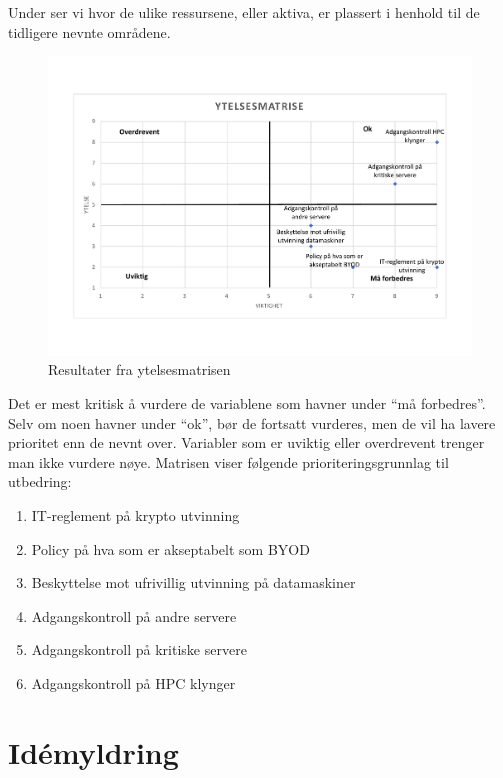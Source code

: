 Under ser vi hvor de ulike ressursene, eller aktiva, er plassert i henhold til de tidligere nevnte områdene.
\begin{figure}[H]
    \centering
    \includegraphics[scale=0.5]{case_3/bilder/ytelsesmatrise.pdf}
    \caption[Ytelsesmatrise]{Resultater fra ytelsesmatrisen}
    \label{fig:ytelsesmatrise}
\end{figure}

Det er mest kritisk å vurdere de variablene som havner under ``må forbedres''. Selv om noen havner under ``ok'', bør de fortsatt vurderes, men de vil ha lavere prioritet enn de nevnt over. Variabler som er uviktig eller overdrevent trenger man ikke vurdere nøye. Matrisen viser følgende prioriteringsgrunnlag til utbedring:

\begin{enumerate}
    \item IT-reglement på krypto utvinning
    \item Policy på hva som er akseptabelt som BYOD
    \item Beskyttelse mot ufrivillig utvinning på datamaskiner
    \item Adgangskontroll på andre servere
    \item Adgangskontroll på kritiske servere
    \item Adgangskontroll på HPC klynger
\end{enumerate}

\section{Idémyldring}
